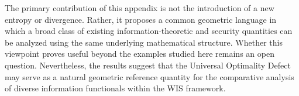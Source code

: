 The primary contribution of this appendix is not the introduction of a
new entropy or divergence.  Rather, it proposes a common geometric
language in which a broad class of existing information-theoretic and
security quantities can be analyzed using the same underlying
mathematical structure.  Whether this viewpoint proves useful beyond the
examples studied here remains an open question.  Nevertheless, the
results suggest that the Universal Optimality Defect may serve as a
natural geometric reference quantity for the comparative analysis of
diverse information functionals within the WIS framework.
